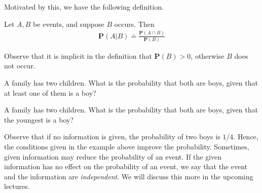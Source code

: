 Motivated by this, we have the following definition.
\begin{definition}
	Let $A, B$ be events, and suppose $B$ occurs. Then
	\begin{align*}
		\mathbf{P}(A | B) \doteq \frac{\mathbf{P}(A \cap B)}{\mathbf{P}(B)}
	\end{align*}
\end{definition}
Observe that it is implicit in the definition that $\mathbf{P}(B) > 0$, otherwise
$B$ does not occur.
\begin{example}
	A family has two children. What is the probability that both are boys,
	given that at least one of them is a boy?
\end{example}
\begin{example}
	A family has two children. What is the probability that both are boys,
	given that the youngest is a boy?
\end{example}
Observe that if no information is given, the probability of two boys is $1/4$.
Hence, the conditions given in the example above improve the probability.
Sometimes, given information may reduce the probability of an event.
If the given information has no effect on the probability of an event,
we say that the event and the information are \emph{independent}. We will
discuss this more in the upcoming lectures.


